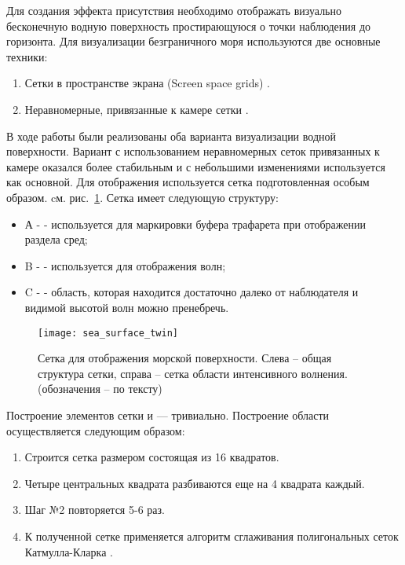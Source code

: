 Для создания эффекта присутствия необходимо отображать визуально бесконечную водную поверхность простирающуюся о точки наблюдения до горизонта. Для визуализации безграничного моря используются две основные техники:
\begin{enumerate}
\item	Сетки в пространстве экрана (Screen space grids) \citep{projgrid}.
\item	Неравномерные, привязанные к камере сетки \cite{crysis}.
\end{enumerate}

В ходе работы были реализованы оба варианта визуализации водной поверхности. Вариант с использованием неравномерных сеток привязанных к камере оказался более стабильным и с небольшими изменениями используется как основной.
Для отображения используется сетка подготовленная особым образом. cм. рис.~\ref{sea_surface_twin}. Сетка имеет следующую структуру: 

\begin{itemize}
\item	А -  - используется для маркировки буфера трафарета при отображении раздела сред; 
\item	B -  - используется для отображения волн; 
\item	C -  - область, которая находится достаточно далеко от наблюдателя и видимой высотой волн можно пренебречь.
\end{itemize}

\begin{figure}[ht]
\begin{center}
\texttt{[image: sea\_surface\_twin]}
\end{center}
\caption{Сетка для отображения морской поверхности. Слева – общая структура сетки, справа – сетка области интенсивного волнения. (обозначения – по тексту)}
\label{sea_surface_twin}
\end{figure}

Построение элементов сетки  и  --- тривиально. Построение области  осуществляется следующим образом:
\begin{enumerate}
	\item	Строится сетка размером состоящая из 16 квадратов.
	\item	Четыре центральных квадрата разбиваются еще на 4 квадрата каждый.
	\item	Шаг №2 повторяется 5-6 раз.
	\item 	К полученной сетке применяется алгоритм сглаживания полигональных сеток Катмулла-Кларка \citep{catmull_clark}.
\end{enumerate}

